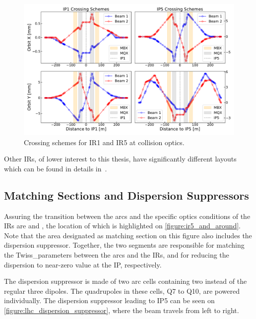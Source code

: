 \begin{figure}[!hbt]
  \centering
  \includegraphics*[width=\linewidth]{Figures/Optics_Measurements_Corrections_at_LHC/lhc_crossing_schemes_ip15.pdf}
  \caption{Crossing schemes for IR\num{1} and IR\num{5} at collision optics.}
  \label{figure:lhc_crossing_schemes_ip15}
\end{figure}

Other IRs, of lower interest to this thesis, have significantly different layouts which can be found in details in~\cite{BOOK:Bruning:LHC_Design_Report_Main_Ring,PHD:Vanbavinckhove}.

\subsection{Matching Sections and Dispersion Suppressors}
\label{subsection:matching_sections_dispersion_suppressors}

Assuring the transition between the arcs and the specific \gls{optics} conditions of the \glspl{IR} are  and , the location of which is highlighted on \cref{figure:ir5_and_around}.
Note that the area designated as matching section on this figure also includes the dispersion suppressor.
Together, the two segments are responsible for matching the \gls{Twiss_parameters} between the arcs and the IRs, and for reducing the dispersion to near-zero value at the IP, respectively.

The dispersion suppressor is made of two arc cells containing two instead of the regular three dipoles.
The quadrupoles in these cells, Q\num{7} to Q\num{10}, are powered individually.
The dispersion suppressor leading to IP\num{5} can be seen on \cref{figure:lhc_dispersion_suppressor}, where the beam travels from left to right.

